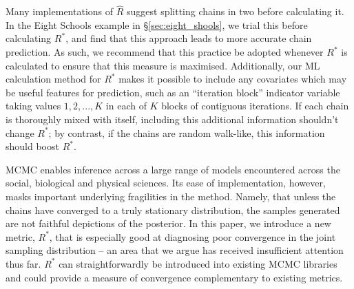 \documentclass{article}
\begin{document}
Many implementations of $\hat{R}$ suggest splitting chains in two before calculating it. In the Eight Schools example in \S\ref{sec:eight_shools}, we trial this before calculating $R^*$, and find that this approach leads to more accurate chain prediction. As such, we recommend that this practice be adopted whenever $R^*$ is calculated to ensure that this measure is maximised. Additionally, our ML calculation method for $R^*$ makes it possible to include any covariates which may be useful features for prediction, such as an ``iteration block'' indicator variable taking values $1, 2, ..., K$ in each of $K$ blocks of contiguous iterations. If each chain is thoroughly mixed with itself, including this additional information shouldn't change $R^*$; by contrast, if the chains are random walk-like, this information should boost $R^*$.

MCMC enables inference across a large range of models encountered across the social, biological and physical sciences. Its ease of implementation, however, masks important underlying fragilities in the method. Namely, that unless the chains have converged to a truly stationary distribution, the samples generated are not faithful depictions of the posterior. In this paper, we introduce a new metric, $R^*$, that is especially good at diagnosing poor convergence in the joint sampling distribution -- an area that we argue has received insufficient attention thus far. $R^*$ can straightforwardly be introduced into existing MCMC libraries and could provide a measure of convergence complementary to existing metrics.

	

 
	
\end{document}
